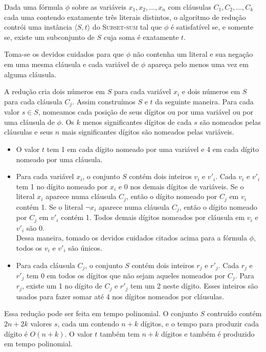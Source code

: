 Dada uma fórmula $\phi$ sobre as variáveis $x_1, x_2, \dots, x_n$ com cláusulas $C_1, C_2, \dots, C_k$ cada uma contendo exatamente três literais distintos, o algoritmo de redução contrói uma instância $\langle S, t \rangle$ do \textsc{Subset-sum} tal que $\phi$ é satisfatível se, e somente se, existe um subconjunto de $S$ cuja soma é exatamente $t$.

Toma-se os devidos cuidados para que $\phi$ não contenha um literal e sua negação em uma mesma cláusula e cada variável de $\phi$ apareça pelo menos uma vez em alguma cláusula.

A redução cria dois números em $S$ para cada variável $x_i$ e dois números em $S$ para cada cláusula $C_j$. Assim construímos $S$ e $t$ da seguinte maneira. Para cada valor $s \in S$, nomeamos cada posição de seus dígitos ou por uma variável ou por uma cláusula de $\phi$. Os $k$ menos significantes dígitos de cada $s$ são nomeados pelas cláusulas e seus $n$ mais significantes dígitos são nomeados pelas variáveis.
	
\begin{itemize}
	\item O valor $t$ tem 1 em cada dígito nomeado por uma variável e 4 em cada dígito nomeado por uma cláusula.
	
	\item Para cada variável $x_i$, o conjunto $S$ contém dois inteiros $v_i$ e $v'_i$. Cada $v_i$ e $v'_i$ tem 1 no dígito nomeado por $x_i$ e 0 nos demais dígitos de variáveis. Se o literal $x_i$ aparece numa cláusula $C_j$, então o dígito nomeado por $C_j$ em $v_i$ contém 1. Se o literal $\lnot x_i$ aparece numa cláusula $C_j$, então o dígito nomeado por $C_j$ em $v'_i$ contém 1. Todos demais dígitos nomeados por cláusula em $v_i$ e $v'_i$ são 0.\\
	Dessa maneira, tomado os devidos cuidados citados acima para a fórmula $\phi$, todos os $v_i$ e $v'_i$ são únicos.
	
	\item Para cada cláusula $C_j$, o conjunto $S$ contém dois inteiros $r_j$ e $r'_j$. Cada $r_j$ e $r'_j$ tem 0 em todos os dígitos que não sejam  aqueles nomeados por $C_j$. Para $r_j$, existe um 1 no dígito de $C_j$ e $r'_j$ tem um 2 neste dígito. Esses inteiros são usados para fazer somar até 4 nos dígitos nomeados por cláusulas.
\end{itemize}

Essa redução pode ser feita em tempo polinomial. O conjunto $S$ contruído contém $2n + 2k$ valores $s$, cada um contendo $n + k$ dígitos, e o tempo para produzir cada dígito é $O(n + k)$. O valor $t$ também tem $n + k$ dígitos e também é produzido em tempo polinomial.

